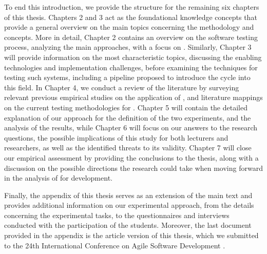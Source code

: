To end this introduction, we provide the structure for the remaining six chapters of this thesis.
Chapters 2 and 3 act as the foundational knowledge concepts that provide a general overview on the main topics concerning the \tdd methodology and \ess concepts. 
More in detail, Chapter 2 contains an overview on the software testing process, analyzing the main approaches, with a focus on \tdd. 
Similarly, Chapter 3 will provide information on the most characteristic \ess topics, discussing the enabling technologies and implementation challenges, before examining the techniques for testing such systems, including a pipeline proposed to introduce the \tdd cycle into this field.
In Chapter 4, we conduct a review of the literature by surveying relevant previous empirical studies on the application of \tdd, and literature mappings on the current testing methodologies for \ess.
Chapter 5 will contain the detailed explanation of our approach for the definition of the two experiments, and the analysis of the results, while Chapter 6 will focus on our answers to the research questions, the possible implications of this study for both lecturers and researchers, as well as the identified threats to its validity.
Chapter 7 will close our empirical assessment by providing the conclusions to the thesis, along with a discussion on the possible directions the research could take when moving forward in the analysis of \tdd for \es development.

Finally, the appendix of this thesis serves as an extension of the main text and provides additional information on our experimental approach, from the details concerning the experimental tasks, to the questionnaires and interviews conducted with the participation of the students. 
Moreover, the last document provided in the appendix is the article version of this thesis, which we submitted to the 24th International Conference on Agile Software Development \cite{XP2023}.